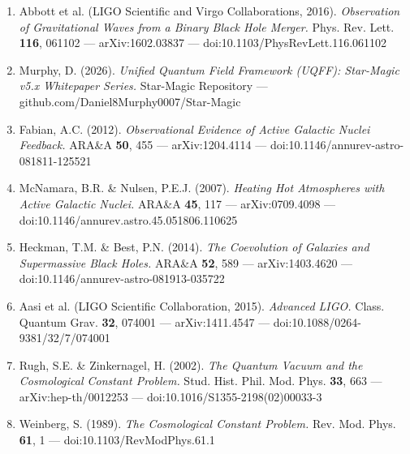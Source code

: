 \documentclass[12pt,a4paper]{article}
\begin{document}
\begin{enumerate}
  \item Abbott et al. (LIGO Scientific and Virgo Collaborations, 2016). \emph{Observation of Gravitational Waves from a Binary Black Hole Merger.} Phys. Rev. Lett. \textbf{116}, 061102 --- arXiv:1602.03837 --- doi:10.1103/PhysRevLett.116.061102
  \item Murphy, D. (2026). \emph{Unified Quantum Field Framework (UQFF): Star-Magic v5.x Whitepaper Series.} Star-Magic Repository --- github.com/Daniel8Murphy0007/Star-Magic
  \item Fabian, A.C. (2012). \emph{Observational Evidence of Active Galactic Nuclei Feedback.} ARA\&A \textbf{50}, 455 --- arXiv:1204.4114 --- doi:10.1146/annurev-astro-081811-125521
  \item McNamara, B.R. \& Nulsen, P.E.J. (2007). \emph{Heating Hot Atmospheres with Active Galactic Nuclei.} ARA\&A \textbf{45}, 117 --- arXiv:0709.4098 --- doi:10.1146/annurev.astro.45.051806.110625
  \item Heckman, T.M. \& Best, P.N. (2014). \emph{The Coevolution of Galaxies and Supermassive Black Holes.} ARA\&A \textbf{52}, 589 --- arXiv:1403.4620 --- doi:10.1146/annurev-astro-081913-035722
  \item Aasi et al. (LIGO Scientific Collaboration, 2015). \emph{Advanced LIGO.} Class. Quantum Grav. \textbf{32}, 074001 --- arXiv:1411.4547 --- doi:10.1088/0264-9381/32/7/074001
  \item Rugh, S.E. \& Zinkernagel, H. (2002). \emph{The Quantum Vacuum and the Cosmological Constant Problem.} Stud. Hist. Phil. Mod. Phys. \textbf{33}, 663 --- arXiv:hep-th/0012253 --- doi:10.1016/S1355-2198(02)00033-3
  \item Weinberg, S. (1989). \emph{The Cosmological Constant Problem.} Rev. Mod. Phys. \textbf{61}, 1 --- doi:10.1103/RevModPhys.61.1
\end{enumerate}


\end{document}
